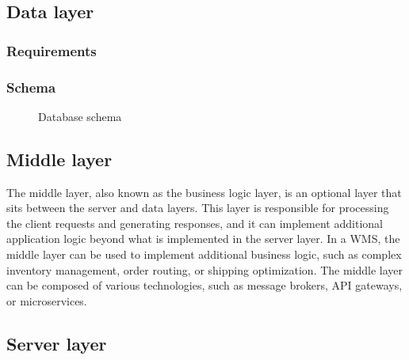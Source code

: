 
\subsection{Data layer}

\subsubsection{Requirements}

\subsubsection{Schema}

    \begin{figure}[!ht]
        \centering
        \caption{Database schema}
        \label{fig:Database schema}
    \end{figure}
\subsection{Middle layer}

The middle layer, also known as the business logic layer, is an optional layer that sits between the server and data layers. This layer is responsible for processing the client requests and generating responses, and it can implement additional application logic beyond what is implemented in the server layer. In a WMS, the middle layer can be used to implement additional business logic, such as complex inventory management, order routing, or shipping optimization. The middle layer can be composed of various technologies, such as message brokers, API gateways, or microservices.

\subsection{Server layer}

